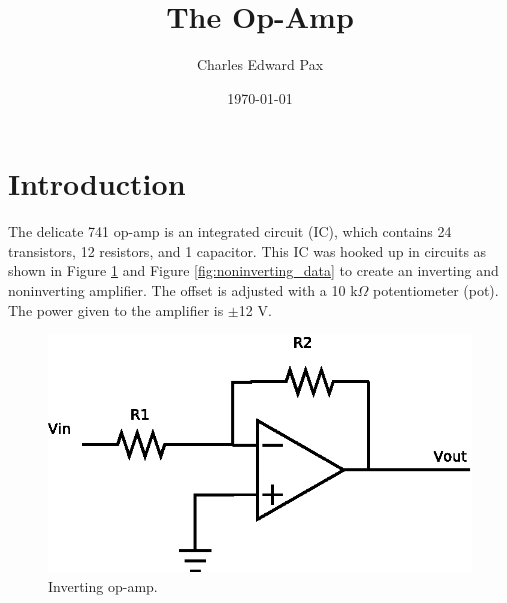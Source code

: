 \documentclass[11pt,onecolumn]{article}
\begin{document}
\title{The Op-Amp}
\date{\today}
\author{Charles Edward Pax}
\maketitle


\section{Introduction}\label{sec:Introduction}
The delicate 741 op-amp is an integrated circuit (IC), which contains 24 transistors, 12 resistors, and 1 capacitor. This IC was hooked up in circuits as shown in Figure \ref{fig:inverting_data} and Figure \ref{fig:noninverting_data} to create an inverting and noninverting amplifier. The offset is adjusted with a 10 k$\Omega$ potentiometer (pot). The power given to the amplifier is $\pm$12 V.
%
%
\begin{figure}
\includegraphics{Diagram1.eps}
\caption{Inverting op-amp.}\label{fig:inverting_data}
\end{figure}
%
%
\end{document}
